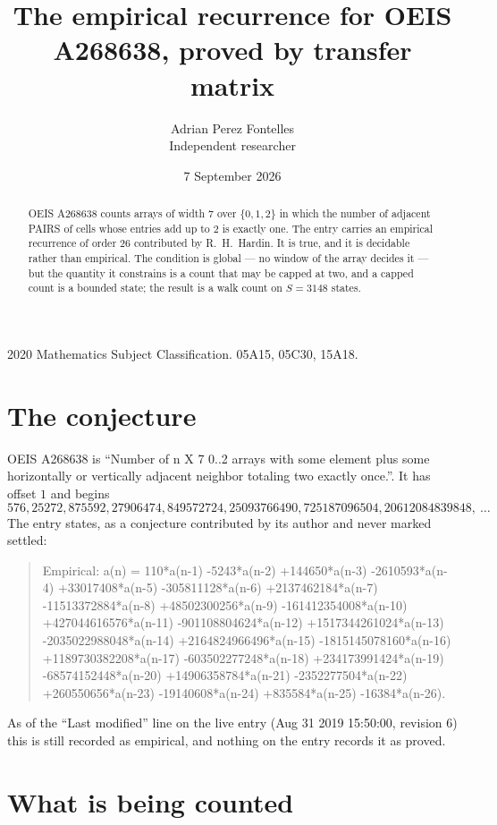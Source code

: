 \documentclass[11pt,a4paper]{article}
\title{The empirical recurrence for OEIS A268638, proved by transfer matrix}
\author{Adrian Perez Fontelles\\ \small Independent researcher}
\date{7 September 2026}
\theoremstyle{plain}
\theoremstyle{definition}
\begin{document}
\maketitle

\begin{abstract}
OEIS A268638 counts arrays of width $7$ over $\{0,1,2\}$ in which the number of adjacent PAIRS of
cells whose entries add up to $2$ is exactly one. The entry carries an empirical recurrence of
order $26$ contributed by R.~H.~Hardin. It is true, and it is decidable rather than
empirical. The condition is global --- no window of the array decides it --- but the quantity
it constrains is a count that may be capped at two, and a capped count is a bounded state; the
result is a walk count on $S=3148$ states.
\end{abstract}

\noindent\small 2020 Mathematics Subject Classification. 05A15, 05C30, 15A18.\normalsize

\section{The conjecture}

OEIS A268638 is ``Number of n X 7 0..2 arrays with some element plus some horizontally or vertically adjacent neighbor totaling two exactly once.''. It has offset $1$ and begins
\[
576, 25272, 875592, 27906474, 849572724, 25093766490, 725187096504, 20612084839848,\ \dots
\]
The entry states, as a conjecture contributed by its author and never marked settled:
\begin{quote}
Empirical: a(n) = 110*a(n-1) -5243*a(n-2) +144650*a(n-3) -2610593*a(n-4) +33017408*a(n-5) -305811128*a(n-6) +2137462184*a(n-7) -11513372884*a(n-8) +48502300256*a(n-9) -161412354008*a(n-10) +427044616576*a(n-11) -901108804624*a(n-12) +1517344261024*a(n-13) -2035022988048*a(n-14) +2164824966496*a(n-15) -1815145078160*a(n-16) +1189730382208*a(n-17) -603502277248*a(n-18) +234173991424*a(n-19) -68574152448*a(n-20) +14906358784*a(n-21) -2352277504*a(n-22) +260550656*a(n-23) -19140608*a(n-24) +835584*a(n-25) -16384*a(n-26).
\end{quote}
As of the ``Last modified'' line on the live entry (Aug 31 2019 15:50:00, revision 6) this is still
recorded as empirical, and nothing on the entry records it as proved.

\section{What is being counted}
\end{document}
